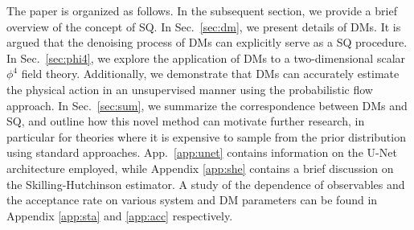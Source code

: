 The paper is organized as follows. In the subsequent section, we provide a brief overview of the concept of SQ. In Sec.~\ref{sec:dm}, we present details of DMs. It is argued that the denoising process of DMs can explicitly serve as a SQ procedure. In Sec.~\ref{sec:phi4}, we explore the application of DMs to a two-dimensional scalar $\phi^4$ field theory.  Additionally, we demonstrate that DMs can accurately estimate the physical action in an unsupervised manner using the probabilistic flow approach. In Sec.~\ref{sec:sum}, we summarize the correspondence between DMs and SQ, and outline how this novel method can motivate further research, in particular for theories where it is expensive to sample from the prior distribution using standard approaches. App.~\ref{app:unet} contains information on the U-Net architecture employed, while Appendix \ref{app:she} contains a brief discussion on the Skilling-Hutchinson estimator.
A study of the dependence of observables and the acceptance rate on various system and DM parameters can be found in Appendix \ref{app:sta} and \ref{app:acc} respectively.

